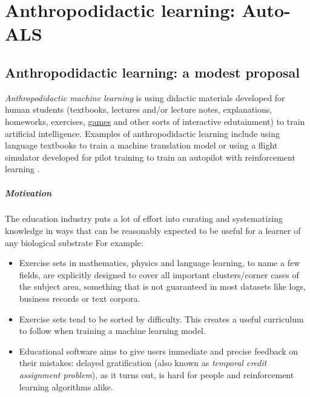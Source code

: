 \chapter{Anthropodidactic learning: Auto-ALS}
\label{ch:auto-als}



\section{Anthropodidactic learning: a modest proposal}
\label{sec:anthropodidactic}

\emph{Anthropodidactic machine learning} is using didactic materials developed for human students (textbooks, lectures and/or lecture notes, explanations, homeworks, exercises, \href{http://www.virtu-als.com/}{games} and other sorts of interactive edutainment) to train artificial intelligence.
Examples of anthropodidactic learning include using language textbooks to train a machine translation model or using a flight simulator developed for pilot training to train an autopilot with reinforcement learning \cite{staudingerXPlaneMLEnvironmentLearning2018}.

\paragraph{Motivation}

The education industry puts a lot of effort into curating and systematizing knowledge in ways that can be reasonably expected to be useful for a learner of any biological substrate
For example: 
\begin{itemize}
    \item Exercise sets in mathematics, physics and language learning, to name a few fields, are explicitly designed to cover all important clusters/corner cases of the subject area, something that is not guaranteed in most datasets like logs, business records or text corpora.
    \item Exercise sets tend to be sorted by difficulty. This creates a useful curriculum to follow when training a machine learning model.
    \item Educational software aims to give users immediate and precise feedback on their mistakes: delayed gratification (also known as \emph{temporal credit assignment problem}), as it turns out, is hard for people \cite{tobinDelayGratificationReview2010} and reinforcement learning algorithms alike.
\end{itemize}

